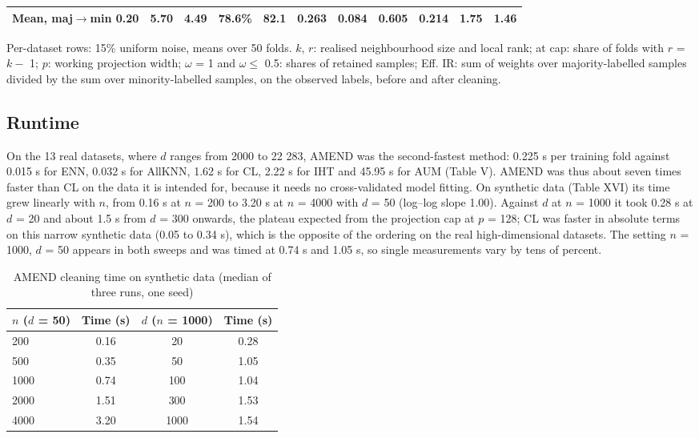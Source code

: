 \documentclass[conference]{IEEEtran}
\begin{document}
\begin{table}[!t]
\begin{adjustbox}{max width=\linewidth}
\begin{tabular}{lcccccccccc}
Mean, maj$\rightarrow $min 0.20 & 5.70 & 4.49 & 78.6\% & 82.1 & 0.263 & 0.084 & 0.605 & 0.214 & 1.75 & 1.46 \\
\hline
\end{tabular}
\end{adjustbox}
\par\vspace{3pt}
\begin{minipage}{\linewidth}\scriptsize Per-dataset rows: 15\% uniform noise, means over 50 folds. $k$, $r$: realised neighbourhood size and local rank; at cap: share of folds with $r$ = $k -$ 1; $p$: working projection width; $\omega $ = 1 and $\omega  \le $ 0.5: shares of retained samples; Eff. IR: sum of weights over majority-labelled samples divided by the sum over minority-labelled samples, on the observed labels, before and after cleaning.\end{minipage}
\end{table}

\subsection{Runtime}\label{sec:runtime}

On the 13 real datasets, where $d$ ranges from 2000 to 22 283, AMEND was the second-fastest method: 0.225 s per training fold against 0.015 s for ENN, 0.032 s for AllKNN, 1.62 s for CL, 2.22 s for IHT and 45.95 s for AUM (Table V). AMEND was thus about seven times faster than CL on the data it is intended for, because it needs no cross-validated model fitting. On synthetic data (Table XVI) its time grew linearly with $n$, from 0.16 s at $n$ = 200 to 3.20 s at $n$ = 4000 with $d$ = 50 (log--log slope 1.00). Against $d$ at $n$ = 1000 it took 0.28 s at $d$ = 20 and about 1.5 s from $d$ = 300 onwards, the plateau expected from the projection cap at $p$ = 128; CL was faster in absolute terms on this narrow synthetic data (0.05 to 0.34 s), which is the opposite of the ordering on the real high-dimensional datasets. The setting $n$ = 1000, $d$ = 50 appears in both sweeps and was timed at 0.74 s and 1.05 s, so single measurements vary by tens of percent.

\begin{table}[!t]
\centering
\footnotesize
\caption{AMEND cleaning time on synthetic data (median of three runs, one seed)}
\label{tab:16}
\setlength{\tabcolsep}{3.5pt}
\begin{adjustbox}{max width=\linewidth}
\begin{tabular}{lccc}
\hline
$n$ ($d$ = 50) & Time (s) & $d$ ($n$ = 1000) & Time (s) \\
\hline
200 & 0.16 & 20 & 0.28 \\
500 & 0.35 & 50 & 1.05 \\
1000 & 0.74 & 100 & 1.04 \\
2000 & 1.51 & 300 & 1.53 \\
4000 & 3.20 & 1000 & 1.54 \\
\hline
\end{tabular}
\end{adjustbox}
\end{table}
\end{document}
